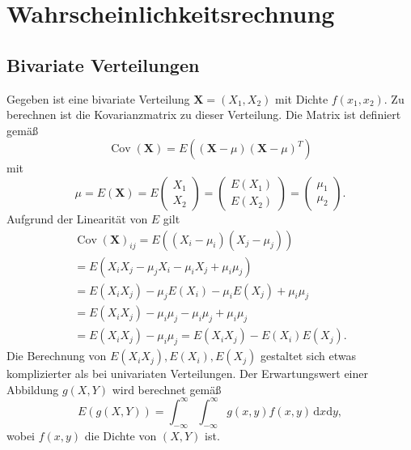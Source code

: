 \documentclass[a4paper,10pt,fleqn,twocolumn,twoside,dvipdfmx]{scrartcl}
\numberwithin{equation}{section}
\DeclareMathOperator{\Cov}{Cov}
\theoremstyle{rmbox}
\begin{document}
\section{Wahrscheinlichkeitsrechnung}
\subsection{Bivariate Verteilungen}

Gegeben ist eine bivariate Verteilung $\mathbf X=(X_1,X_2)$ mit Dichte
$f(x_1,x_2)$. Zu berechnen ist die Kovarianzmatrix zu dieser
Verteilung. Die Matrix ist definiert gemäß%
\begin{equation}
\Cov(\mathbf X) = E((\mathbf X-\mu)(\mathbf X-\mu)^T)
\end{equation}
mit
\begin{equation}
\mu = E(\mathbf X) = E\begin{pmatrix}X_1\\ X_2\end{pmatrix}
= \begin{pmatrix}
E(X_1)\\ E(X_2)
\end{pmatrix}
= \begin{pmatrix}\mu_1\\ \mu_2\end{pmatrix}.
\end{equation}
Aufgrund der Linearität von $E$ gilt
\begin{gather*}
\Cov(\mathbf X)_{ij} = E((X_i-\mu_i)(X_j-\mu_j))\\
= E(X_i X_j-\mu_j X_i-\mu_i X_j+\mu_i\mu_j)\\
= E(X_i X_j)-\mu_j E(X_i)-\mu_i E(X_j)+\mu_i\mu_j\\
= E(X_i X_j)-\mu_i \mu_j-\mu_i \mu_j+\mu_i\mu_j\\
= E(X_i X_j)-\mu_i\mu_j
= E(X_i X_j)-E(X_i)E(X_j).
\end{gather*}
Die Berechnung von $E(X_i X_j),E(X_i),E(X_j)$ gestaltet
sich etwas komplizierter als bei univariaten Verteilungen.
Der Erwartungswert einer Abbildung $g(X,Y)$ wird berechnet
gemäß%
\begin{equation}\label{eq:E-of-bivariate-map}
E(g(X,Y)) = \int_{-\infty}^\infty\int_{-\infty}^\infty
g(x,y)f(x,y)\,\mathrm dx\mathrm dy,
\end{equation}
wobei $f(x,y)$ die Dichte von $(X,Y)$ ist.
\end{document}
